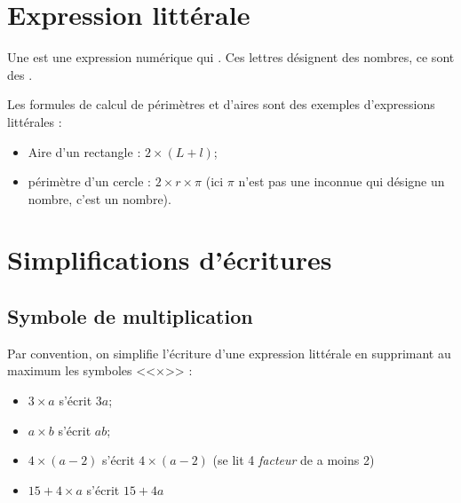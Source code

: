 \documentclass[12pt,a4paper]{article}
\date{}
\title{}
\begin{document}







\section{Expression littérale}


\begin{mydef}
	Une  est une expression numérique qui . Ces lettres désignent des nombres, ce sont des .
\end{mydef}

\begin{myexs}
	Les formules de calcul de périmètres et d'aires sont des exemples d'expressions littérales :
	\begin{itemize}
		\item Aire d'un rectangle : $2 \times (L + l)$;
		\item périmètre d'un cercle : $2 \times r \times \pi$ (ici $\pi$ n'est pas une inconnue qui désigne un nombre, c'est un nombre).
	\end{itemize}
\end{myexs}

\section{Simplifications d'écritures}

\subsection{Symbole de multiplication}
\begin{mymeth}
	Par convention, on simplifie l'écriture d'une expression littérale en supprimant au maximum les symboles <<$\times$>> :
	\begin{itemize}
		\item $3 \times a $ s'écrit $3a$;
		\item $a \times b $ s'écrit $ab$;
		\item $4 \times (a - 2)$ s'écrit $4 \times (a - 2)$ (se lit 4 \textit{facteur} de a moins 2)
		\item $15 + 4 \times a$ s'écrit $15 + 4a$
	\end{itemize}
\end{mymeth}
\end{document}
